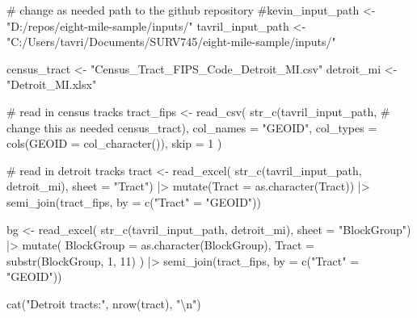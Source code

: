 \documentclass[
  12pt]{article}
\newenvironment{Shaded}{\begin{snugshade}}{\end{snugshade}}
\newcommand{\AttributeTok}[1]{\textcolor[rgb]{0.40,0.45,0.13}{#1}}
\newcommand{\CommentTok}[1]{\textcolor[rgb]{0.37,0.37,0.37}{#1}}
\newcommand{\DecValTok}[1]{\textcolor[rgb]{0.68,0.00,0.00}{#1}}
\newcommand{\FunctionTok}[1]{\textcolor[rgb]{0.28,0.35,0.67}{#1}}
\newcommand{\NormalTok}[1]{\textcolor[rgb]{0.00,0.23,0.31}{#1}}
\newcommand{\OtherTok}[1]{\textcolor[rgb]{0.00,0.23,0.31}{#1}}
\newcommand{\SpecialCharTok}[1]{\textcolor[rgb]{0.37,0.37,0.37}{#1}}
\newcommand{\StringTok}[1]{\textcolor[rgb]{0.13,0.47,0.30}{#1}}
\begin{document}
\begin{Shaded}
\begin{Highlighting}[]
\CommentTok{\# change as needed path to the github repository}
\CommentTok{\#kevin\_input\_path \textless{}{-} "D:/repos/eight{-}mile{-}sample/inputs/"}
\NormalTok{tavril\_input\_path }\OtherTok{\textless{}{-}} \StringTok{"C:/Users/tavri/Documents/SURV745/eight{-}mile{-}sample/inputs/"}

\NormalTok{census\_tract }\OtherTok{\textless{}{-}} \StringTok{"Census\_Tract\_FIPS\_Code\_Detroit\_MI.csv"}
\NormalTok{detroit\_mi }\OtherTok{\textless{}{-}} \StringTok{"Detroit\_MI.xlsx"}


\CommentTok{\# read in census tracks}
\NormalTok{tract\_fips }\OtherTok{\textless{}{-}} \FunctionTok{read\_csv}\NormalTok{(}
  \FunctionTok{str\_c}\NormalTok{(tavril\_input\_path, }\CommentTok{\# change this as needed}
\NormalTok{        census\_tract), }\AttributeTok{col\_names =} \StringTok{"GEOID"}\NormalTok{,}
  \AttributeTok{col\_types =} \FunctionTok{cols}\NormalTok{(}\AttributeTok{GEOID =} \FunctionTok{col\_character}\NormalTok{()),}
  \AttributeTok{skip =} \DecValTok{1}
\NormalTok{)}

\CommentTok{\# read in detroit tracks}
\NormalTok{tract }\OtherTok{\textless{}{-}} \FunctionTok{read\_excel}\NormalTok{(}
  \FunctionTok{str\_c}\NormalTok{(tavril\_input\_path,}
\NormalTok{        detroit\_mi), }\AttributeTok{sheet =} \StringTok{"Tract"}\NormalTok{) }\SpecialCharTok{|\textgreater{}}
  \FunctionTok{mutate}\NormalTok{(}\AttributeTok{Tract =} \FunctionTok{as.character}\NormalTok{(Tract)) }\SpecialCharTok{|\textgreater{}}
  \FunctionTok{semi\_join}\NormalTok{(tract\_fips, }\AttributeTok{by =} \FunctionTok{c}\NormalTok{(}\StringTok{"Tract"} \OtherTok{=} \StringTok{"GEOID"}\NormalTok{))}

\NormalTok{bg }\OtherTok{\textless{}{-}} \FunctionTok{read\_excel}\NormalTok{(}
   \FunctionTok{str\_c}\NormalTok{(tavril\_input\_path,}
\NormalTok{        detroit\_mi), }\AttributeTok{sheet =} \StringTok{"BlockGroup"}\NormalTok{) }\SpecialCharTok{|\textgreater{}}
  \FunctionTok{mutate}\NormalTok{(}
    \AttributeTok{BlockGroup =} \FunctionTok{as.character}\NormalTok{(BlockGroup),}
    \AttributeTok{Tract =} \FunctionTok{substr}\NormalTok{(BlockGroup, }\DecValTok{1}\NormalTok{, }\DecValTok{11}\NormalTok{)}
\NormalTok{  ) }\SpecialCharTok{|\textgreater{}}
  \FunctionTok{semi\_join}\NormalTok{(tract\_fips, }\AttributeTok{by =} \FunctionTok{c}\NormalTok{(}\StringTok{"Tract"} \OtherTok{=} \StringTok{"GEOID"}\NormalTok{))}

\FunctionTok{cat}\NormalTok{(}\StringTok{"Detroit tracts:"}\NormalTok{, }\FunctionTok{nrow}\NormalTok{(tract), }\StringTok{"}\SpecialCharTok{\textbackslash{}n}\StringTok{"}\NormalTok{)}
\end{Highlighting}
\end{Shaded}
\end{document}
